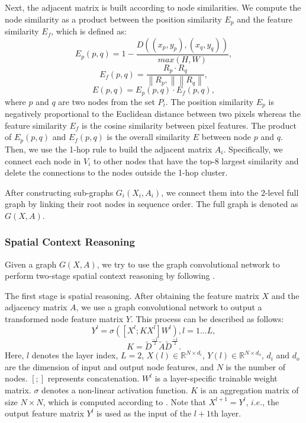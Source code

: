 \documentclass[letterpaper]{article} \usepackage{aaai22}  \usepackage{times}  \usepackage{helvet}  \usepackage{courier}  \usepackage[hyphens]{url}  \usepackage{graphicx} \urlstyle{rm} \def\UrlFont{\rm}  \usepackage{natbib}  \usepackage{caption} \DeclareCaptionStyle{ruled}{labelfont=normalfont,labelsep=colon,strut=off} \frenchspacing  \setlength{\pdfpagewidth}{8.5in}  \setlength{\pdfpageheight}{11in}
\begin{document}
Next, the adjacent matrix is built according to node similarities. We compute the node similarity as a product between the position similarity $E_p$ and the feature similarity $E_f$, which is defined as:
\begin{equation}
	E_{p}(p,q) = 1-\frac{D\left ( (x_p, y_p) , (x_q, y_q)\right )}{max\left (H ,W \right )},
\end{equation}
\begin{equation}
    E_{f}(p,q) = \frac{R_{p}\cdot R_{q}}{\left \| R_{p}, \right \| \left \| R_{q} \right \|},
\end{equation}
\begin{equation}
    E(p,q) = E_{p}(p,q) \cdot E_{f}(p,q),
    \label{eq:ps}
\end{equation}
where $p$ and $q$ are two nodes from the set $P_i$. The position similarity $E_p$ is negatively proportional to the Euclidean distance between two pixels whereas the feature similarity $E_f$ is the cosine similarity between pixel features. The product of $E_p(p,q)$ and $E_f(p,q)$ is the overall similarity $E$ between node $p$ and $q$. Then, we use the 1-hop rule \cite{wang2019linkage} to build the adjacent matrix $A_i$. Specifically, we connect each node in $V_i$ to other nodes that have the top-$8$ largest similarity and delete the connections to the nodes outside the 1-hop cluster. 


After constructing sub-graphs $G_i(X_i, A_i)$, we connect them into the $2$-level full graph by linking their root nodes in sequence order. The full graph is denoted as $G(X, A)$.






\subsubsection{Spatial Context Reasoning}

Given a graph $G(X,A)$, we try to use the graph convolutional network to perform two-stage spatial context reasoning by following \cite{zhang2020deep, kipf2016semi}. 


The first stage is spatial reasoning. After obtaining the feature matrix $X$ and the adjacency matrix $A$, we use a graph convolutional network to output a transformed node feature matrix $Y$.
This process can be described as follows:
\begin{equation}
		Y^l = \sigma ([X^{l}; KX^{l}]W^{l}), l=1...L,
\end{equation}
\begin{equation}
		K=\tilde{D}^{\frac{-1}{2}}\tilde{A}\tilde{D}^{\frac{-1}{2}}.
		\label{eq:G}
\end{equation}
Here, $l$ denotes the layer index, $L=2$, $X(l)\in \mathbb R^{N\times d_{i}}$, $Y(l) \in \mathbb R^{N \times d_{o}} $, $d_{i}$ and $d_{o}$ are the dimension of input and output node features, and $N$ is the number of nodes. $[;]$ represents concatenation. $W^{l} $ is a layer-specific trainable weight matrix. $\sigma$ denotes a non-linear activation function. $K$ is an aggregation matrix of size $N \times N$, which is computed according to \cite{kipf2016semi}. Note that $X^{l+1}=Y^l$, $i.e.$, the output feature matrix $Y^l$ is used as the input of the $l+1$th layer. 
\end{document}
